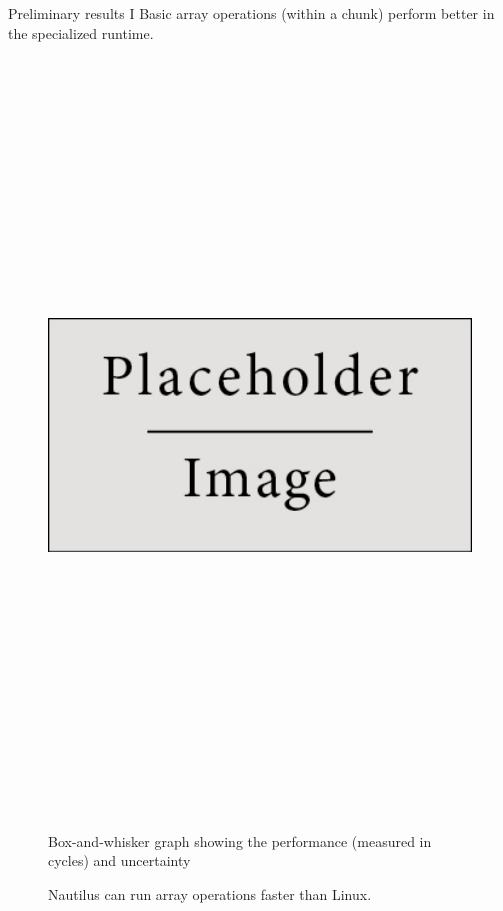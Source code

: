 \begin{block}{Preliminary results I}
  Basic array operations (within a chunk) perform better in the specialized runtime.

  \begin{figure}
    \includegraphics[height=20cm]{place_holder.png}

    Box-and-whisker graph showing the performance (measured in cycles) and uncertainty
    \caption{Nautilus can run array operations faster than Linux.}
  \end{figure}



\end{block}
